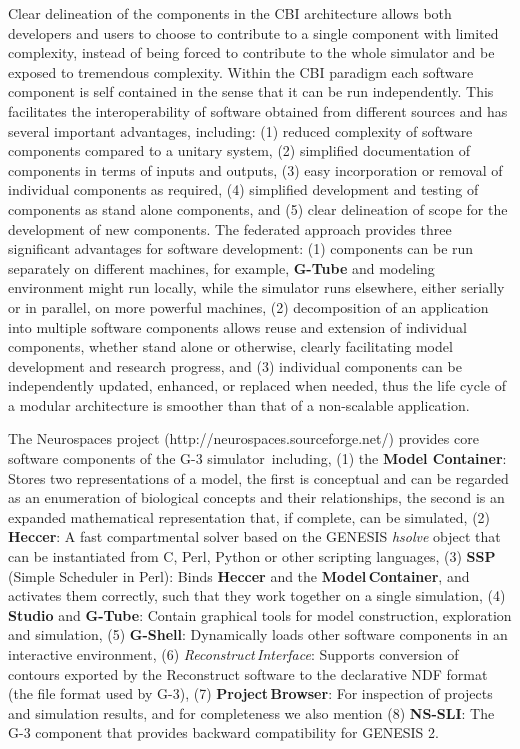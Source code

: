 \documentclass[12pt]{article}
\begin{document}
Clear delineation of the components in the CBI architecture allows both
developers and users to choose to contribute to a single component
with limited complexity, instead of being forced to contribute to the
whole simulator and be exposed to tremendous complexity. Within the
CBI paradigm each software component is self contained in the sense
that it can be run independently. This facilitates the
interoperability of software obtained from different sources and has
several important advantages, including: (1) reduced complexity of
software components compared to a unitary system, (2) simplified
documentation of components in terms of inputs and outputs, (3) easy
incorporation or removal of individual components as required, (4)
simplified development and testing of components as stand alone
components, and (5) clear delineation of scope for the development of new
components. The federated approach provides three significant advantages
for software development: (1) components can be run separately on
different machines, for example, {\bf G-Tube} and modeling environment
might run locally, while the simulator runs elsewhere, either serially
or in parallel, on more powerful machines, (2) decomposition of an
application into multiple software components allows reuse and
extension of individual components, whether stand alone or otherwise,
clearly facilitating model development and research progress, and (3)
individual components can be independently updated, enhanced, or
replaced when needed, thus the life cycle of a modular architecture is
smoother than that of a non-scalable application.

The Neurospaces project (http://neurospaces.sourceforge.net/) provides core software components of the G-3 simulator\,\cite{cornelis03:_neuros} including, (1) the
{\bf Model Container}: Stores two representations of a model, the
first is conceptual and can be regarded as an enumeration of
biological concepts and their relationships, the second is an expanded
mathematical representation that, if complete, can be simulated, (2)
{\bf Heccer}: A fast compartmental solver based on the GENESIS {\it
  hsolve} object that can be instantiated from C, Perl, Python or
other scripting languages, (3) {\bf SSP} (Simple Scheduler in Perl): Binds {\bf Heccer} and the {\bf Model\,Container}, and activates them correctly,
such that they work together on a single simulation, (4) {\bf Studio} and {\bf G-Tube}: Contain graphical tools
for model construction, exploration and simulation, (5) {\bf G-Shell}: Dynamically loads other software components in
an interactive environment, (6) {\it Reconstruct\,Interface}: Supports conversion of contours exported by the Reconstruct software
to the declarative NDF format (the file format used by
G-3), (7) {\bf Project\,Browser}: For inspection of projects and
simulation results, and for completeness we also mention (8) {\bf NS-SLI}: The G-3 component that provides backward compatibility for GENESIS 2.
\end{document}
